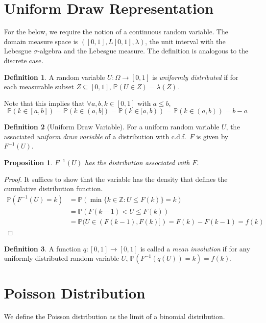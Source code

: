 \documentclass[a4paper,11pt,oneside]{book}
\theoremstyle{plain}
\newtheorem{prop}[thm]{Proposition}
\theoremstyle{definition}
\newtheorem{defn}{Definition}[section]
\begin{document}
\section{Uniform Draw Representation}
For the below, we require the notion of a continuous random variable. The domain measure space is $([0,1], L[0,1],\lambda)$, the unit interval with the Lebesgue $\sigma$-algebra and the Lebesgue measure. The definition is analogous to the discrete case.
\begin{defn}
A random variable $U:\Omega \rightarrow [0,1]$ is \emph{uniformly distributed} if for each measurable subset $Z \subseteq [0,1]$, $\mathbb{P}(U \in Z)=\lambda(Z)$.
\end{defn}
Note that this implies that $\forall a,b,k \in [0,1]$ with $a\le b$, \[\mathbb{P}(k \in [a,b])=\mathbb{P}(k \in (a,b])=\mathbb{P}(k \in [a,b))=\mathbb{P}(k \in (a,b))=b-a\]
\begin{defn}[Uniform Draw Variable]
For a uniform random variable $U$, the associated \emph{uniform draw variable} of a distribution with c.d.f.~$F$ is given by $F^{-1}(U)$.
\end{defn}
\begin{prop}
$F^{-1}(U)$ has the distribution associated with $F$.
\end{prop}
\begin{proof}
It suffices to show that the variable has the density that defines the cumulative distribution function.
\begin{align*}
\mathbb{P}(F^{-1}(U)=k)&=\mathbb{P}(\min\{k \in \mathbb{Z}: U \le F(k)\}=k)\\
&=\mathbb{P}(F(k-1)<U \le F(k))\\
&=\mathbb{P}(U \in (F(k-1), F(k)])=F(k)-F(k-1)=f(k)
\end{align*}
\end{proof}
\begin{defn}
A function $q:[0,1]\rightarrow [0,1]$ is called a \emph{mean involution} if for any uniformly distributed random variable $U$, $\mathbb{P}(F^{-1}(q(U))=k)=f(k)$.
\end{defn}
\section{Poisson Distribution}
We define the Poisson distribution as the limit of a binomial distribution.
\end{document}
